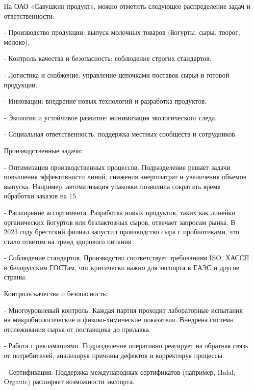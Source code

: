 {\gostFont

  \par \redline На ОАО «Савушкин продукт», можно отметить следующее распределение задач и ответственности:
  \par \redline - Производство продукции: выпуск молочных товаров (йогурты, сыры, творог, молоко).
  \par \redline - Контроль качества и безопасность: соблюдение строгих стандартов.
  \par \redline - Логистика и снабжение: управление цепочками поставок сырья и готовой продукции.
  \par \redline - Инновации: внедрение новых технологий и разработка продуктов.
  \par \redline - Экология и устойчивое развитие: минимизация экологического следа.
  \par \redline - Социальная ответственность: поддержка местных сообществ и сотрудников.

  \par \redline Производственные задачи:
  \par \redline - Оптимизация производственных процессов. Подразделение решает задачи повышения эффективности линий, снижения энергозатрат и увеличения объемов выпуска. Например, автоматизация упаковки позволила сократить время обработки заказов на 15%
  \par \redline - Расширение ассортимента. Разработка новых продуктов, таких как линейки органических йогуртов или безлактозных сыров, отвечает запросам рынка. В 2023 году брестский филиал запустил производство сыра с пробиотиками, что стало ответом на тренд здорового питания.
  \par \redline - Соблюдение стандартов. Производство соответствует требованиям ISO, ХАССП и белорусским ГОСТам, что критически важно для экспорта в ЕАЭС и другие страны.

  \par \redline Контроль качества и безопасность:
  \par \redline - Многоуровневый контроль. Каждая партия проходит лабораторные испытания на микробиологические и физико-химические показатели. Внедрена система отслеживания сырья от поставщика до прилавка.
  \par \redline - Работа с рекламациями. Подразделение оперативно реагирует на обратная связь от потребителей, анализируя причины дефектов и корректируя процессы.
  \par \redline - Сертификация. Поддержка международных сертификатов (например, Halal, Orga\-nic) расширяет возможности экспорта.

}
